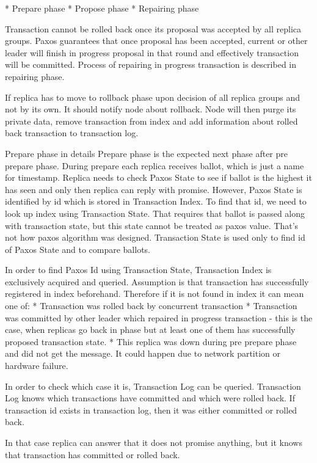 * Prepare phase
* Propose phase
* Repairing phase


Transaction cannot be rolled back once its proposal was accepted by all replica groups. Paxos guarantees that once proposal has been accepted, current or other leader will finish in progress proposal in that round and effectively transaction will be committed. Process of repairing in progress transaction is described in repairing phase.


If replica has to move to rollback phase upon decision of all replica groups and not by its own. It should notify node about rollback. Node will then purge its private data, remove transaction from index and add information about rolled back transaction to transaction log.


        Prepare phase in details
Prepare phase is the expected next phase after pre prepare phase. During prepare each replica receives ballot, which is just a name for timestamp. Replica needs to check Paxos State to see if ballot is the highest it has seen and only then replica can reply with promise. However, Paxos State is identified by id which is stored in Transaction Index. To find that id, we need to look up index using Transaction State. That requires that ballot is passed along with transaction state, but this state cannot be treated as paxos value. That’s not how paxos algorithm was designed. Transaction State is used only to find id of Paxos State and to compare ballots.


In order to find Paxos Id using Transaction State, Transaction Index is exclusively acquired and queried. Assumption is that transaction has successfully registered in index beforehand. Therefore if it is not found in index it can mean one of:
* Transaction was rolled back by concurrent transaction
* Transaction was committed by other leader which repaired in progress transaction - this is the case, when replicas go back in phase but at least one of them has successfully proposed transaction state.
* This replica was down during pre prepare phase and did not get the message. It could happen due to network partition or hardware failure.


In order to check which case it is, Transaction Log can be queried. Transaction Log knows which transactions have committed and which were rolled back. If transaction id exists in transaction log, then it was either committed or rolled back.


In that case replica can answer that it does not promise anything, but it knows that transaction has committed or rolled back.


